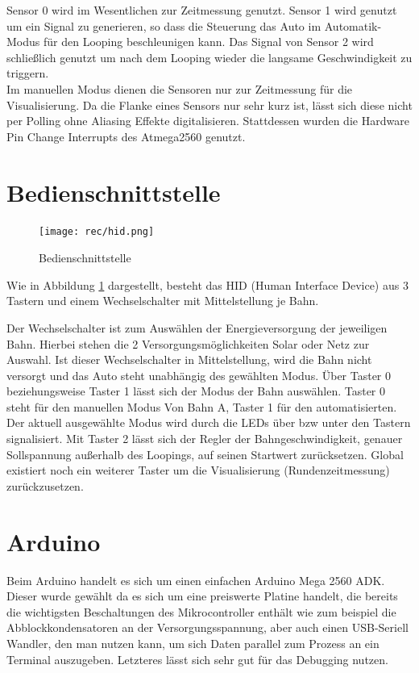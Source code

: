 \documentclass[a4paper, 11pt]{report}
\begin{document}
		Sensor 0 wird im Wesentlichen zur Zeitmessung genutzt.
		Sensor 1 wird genutzt um ein Signal zu generieren, so dass die Steuerung das Auto im Automatik-Modus für den Looping beschleunigen kann.
		Das Signal von Sensor 2 wird schließlich genutzt um nach dem Looping wieder die langsame Geschwindigkeit zu triggern.\\

		Im manuellen Modus dienen die Sensoren nur zur Zeitmessung für die Visualisierung.
		Da die Flanke eines Sensors nur sehr kurz ist, lässt sich diese nicht per Polling ohne Aliasing Effekte digitalisieren. Stattdessen wurden die Hardware	Pin Change Interrupts des Atmega2560 genutzt.
	\section{Bedienschnittstelle}
		\begin{figure}[ht]
			\centering
			\texttt{[image: rec/hid.png]}
			\caption{Bedienschnittstelle}
			\label{img:hid}
		\end{figure}
		Wie in Abbildung \ref{img:hid} dargestellt, besteht das HID (Human Interface Device) aus 3 Tastern und einem Wechselschalter mit Mittelstellung je Bahn.

		Der Wechselschalter ist zum Auswählen der Energieversorgung der jeweiligen Bahn. Hierbei stehen die 2 Versorgungsmöglichkeiten Solar oder Netz zur Auswahl. Ist dieser Wechselschalter in Mittelstellung, wird die Bahn nicht versorgt und das Auto steht unabhängig des gewählten Modus.
		Über Taster 0 beziehungsweise Taster 1 lässt sich der Modus der Bahn auswählen. Taster 0 steht für den manuellen Modus Von Bahn A, Taster 1 für den automatisierten. Der aktuell ausgewählte Modus wird durch die LEDs über bzw unter den Tastern signalisiert.
		Mit Taster 2 lässt sich der Regler der Bahngeschwindigkeit, genauer Sollspannung außerhalb des Loopings, auf seinen Startwert zurücksetzen.
		Global existiert noch ein weiterer Taster um die Visualisierung (Rundenzeitmessung) zurückzusetzen.
	\section{Arduino}
		Beim Arduino handelt es sich um einen einfachen Arduino Mega 2560 ADK.\\
		Dieser wurde gewählt da es sich um eine preiswerte Platine handelt, die bereits die wichtigsten Beschaltungen des Mikrocontroller enthält wie zum beispiel die Abblockkondensatoren an der Versorgungsspannung, aber auch einen USB-Seriell Wandler, den man nutzen kann, um sich Daten parallel zum Prozess an ein Terminal auszugeben.
		Letzteres lässt sich sehr gut für das Debugging nutzen.
\end{document}
